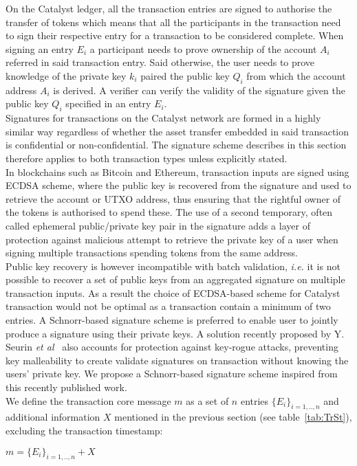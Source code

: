 On the Catalyst ledger, all the transaction entries are signed to authorise the transfer of tokens which means that all the participants in the transaction need to sign their respective entry for a transaction to be considered complete. When signing an entry $E_i$ a participant needs to prove ownership of the account $A_i$ referred in said transaction entry. Said otherwise, the user needs to prove knowledge of the private key $k_i$ paired the public key $Q_i$ from which the account address $A_i$ is derived. A verifier can verify the validity of the signature given the public key $Q_i$ specified in an entry $E_i$.\\

Signatures for transactions on the Catalyst network are formed in a highly similar way regardless of whether the asset transfer embedded in said transaction is confidential or non-confidential. The signature scheme describes in this section therefore applies to both transaction types unless explicitly stated. \\

In blockchains such as Bitcoin and Ethereum, transaction inputs are signed using ECDSA scheme, where the public key is recovered from the signature and used to retrieve the account or UTXO address, thus ensuring that the rightful owner of the tokens is authorised to spend these. The use of a second temporary, often called ephemeral public/private key pair in the signature adds a layer of protection against malicious attempt to retrieve the private key of a user when signing multiple transactions spending tokens from the same address.\\
 
 Public key recovery is however incompatible with batch validation, \textit{i.e.} it is not possible to recover a set of public keys from an aggregated signature on multiple transaction inputs. As a result the choice of ECDSA-based scheme for Catalyst transaction would not be optimal as a transaction contain a minimum of two entries. A Schnorr-based signature scheme is preferred to enable user to jointly produce a signature using their private keys. A solution recently proposed by Y. Seurin \textit{et al}~\cite{schnorr} also accounts for protection against key-rogue attacks, preventing key malleability to create validate signatures on transaction without knowing the users' private key. We propose a Schnorr-based signature scheme inspired from this recently published work. \\

We define the transaction core message $m$ as a set of $n$ entries $\{E_i\}_{i=1,..,n}$  and additional information $X$ mentioned in the previous section (see table~\ref{tab:TrSt}), excluding the transaction timestamp:
\begin{center}
$m = \{E_i\}_{i=1,..,n} + X$ 
\end{center}

